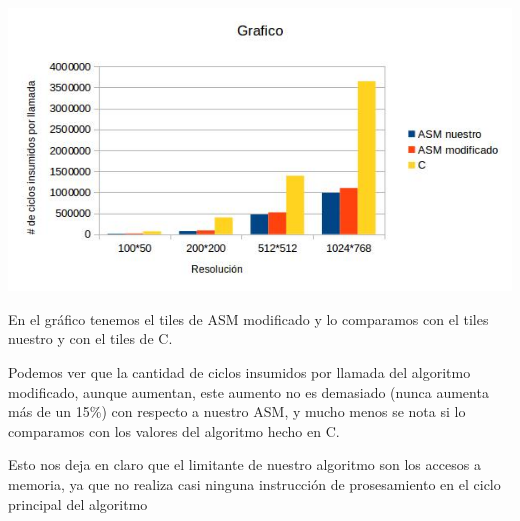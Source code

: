 \begin{center}
 \includegraphics[scale=0.7]{tilesmod.jpg}
\end{center}

En el gráfico tenemos el tiles de ASM modificado y lo comparamos con el tiles nuestro y con el tiles de C.\vspace*{0.3cm} \noindent

Podemos ver que la cantidad de ciclos insumidos por llamada del algoritmo modificado, aunque aumentan, 
este aumento no es demasiado (nunca aumenta más de un 15\%) con respecto a nuestro ASM, y mucho menos se 
nota si lo comparamos con los valores del algoritmo hecho en C. \vspace*{0.3cm} \noindent

Esto nos deja en claro que el limitante de nuestro algoritmo son los accesos a memoria, ya que no realiza 
casi ninguna instrucción de prosesamiento en el ciclo principal del algoritmo \vspace*{0.3cm} \noindent

